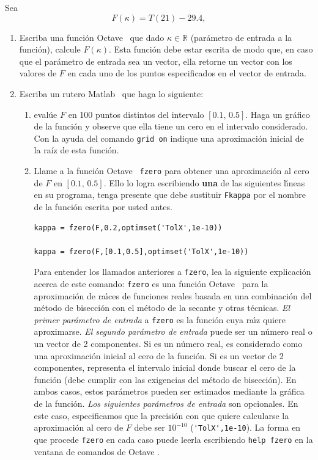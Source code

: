 \documentclass[letter,11pt]{article}
\newcommand\R{\mathbb{R}}
\newcommand\0{\mathbf{0}}
\newcommand{\matlab}{{\sc Matlab} }
\newcommand{\octave}{{\sc Octave} }
\begin{document}
		Sea
		\[
			F(\kappa) = T(21) - 29.4,
		\]
		\begin{enumerate}
			\item \label{funcionF} Escriba una funci\'on \octave\, que dado $\kappa \in \R$ (par\'ametro de entrada
				a la funci\'on), calcule $F(\kappa)$. Esta funci\'on debe estar
				escrita de modo que, en caso que el par\'ametro de entrada sea un vector, ella
				retorne un vector con los valores de $F$ en cada uno de los puntos especificados
				en el vector de entrada.

			\item \label{encontrarkappa} Escriba un rutero \matlab\, que haga lo siguiente:
				
				\begin{enumerate}
					\item eval\'ue $F$ en 100 puntos distintos del intervalo $[0.1,\,0.5]$. Haga un gr\'afico de
						la funci\'on y observe que ella tiene un cero en el intervalo considerado. Con la ayuda del comando \verb+grid on+ indique una aproximaci\'on inicial de la ra\'iz de esta funci\'on.

					\item Llame a la funci\'on \octave\, \verb+fzero+
						para obtener una aproximaci\'on al cero de $F$ en $[0.1,\,0.5]$.
						Ello lo logra escribiendo {\bf una} de las siguientes l\'{\i}neas en su programa, tenga
						presente que debe sustituir \verb+Fkappa+ por el nombre de la funci\'on escrita por usted antes.

						\medskip

\begin{lstlisting}
kappa = fzero(F,0.2,optimset('TolX',1e-10))

kappa = fzero(F,[0.1,0.5],optimset('TolX',1e-10))
\end{lstlisting}
						
						\medskip

						Para entender los llamados anteriores a \verb+fzero+,
						lea la siguiente explicaci\'on acerca
						de este comando: \verb+fzero+ es una funci\'on \octave\, para la aproxi\-ma\-ci\'on
						de ra\'{\i}ces de funciones reales basada en una combinaci\'on del
						m\'etodo de bisecci\'on con el m\'etodo de la secante y otras t\'ecnicas.
						{\em El primer par\'ametro
						de entrada} a \verb+fzero+ es la funci\'on cuya ra\'{\i}z quiere aproximarse.
						{\em El segundo par\'ametro de entrada} puede ser un n\'umero real
						o un vector de 2 componentes. Si es un n\'umero real, es considerado
						como una aproximaci\'on inicial al cero de la funci\'on. Si es un vector
						de 2 componentes, representa el intervalo inicial donde buscar el cero
						de la funci\'on (debe cumplir con las exigencias del m\'etodo de bisecci\'on). En ambos casos, estos par\'ametros pueden ser estimados mediante la gr\'afica de la funci\'on.
						{\em Los siguientes pa\-r\'a\-me\-tros de entrada} son opcionales. En este caso, especificamos
						que la precisi\'on con que quiere calcularse la aproximaci\'on al cero de $F$ debe
						ser $10^{-10}$ (\verb+'TolX',1e-10+). La forma en que
						procede \verb+fzero+ en cada caso puede leerla escribiendo
						\verb+help fzero+ en la ventana de comandos de \octave.
						

\end{enumerate}
\end{enumerate}
\end{document}
